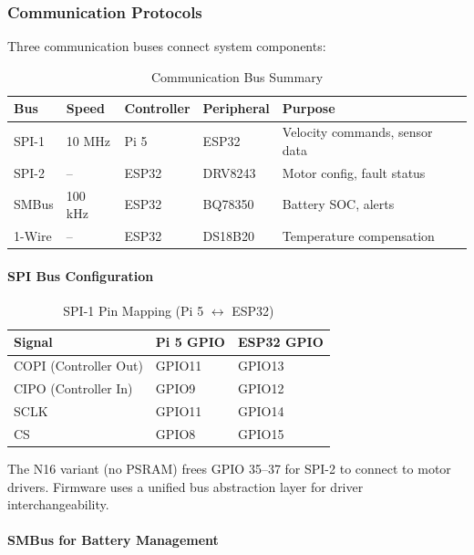 \subsubsection{Communication Protocols}

Three communication buses connect system components:

\begin{table}[H]
\centering
\caption{Communication Bus Summary}
\begin{tabular}{@{}llllp{4cm}@{}}
\toprule
\textbf{Bus} & \textbf{Speed} & \textbf{Controller} & \textbf{Peripheral} & \textbf{Purpose} \\
\midrule
SPI-1 & 10 MHz & Pi 5 & ESP32 & Velocity commands, sensor data \\
SPI-2 & -- & ESP32 & DRV8243 & Motor config, fault status \\
SMBus & 100 kHz & ESP32 & BQ78350 & Battery SOC, alerts \\
1-Wire & -- & ESP32 & DS18B20 & Temperature compensation \\
\bottomrule
\end{tabular}
\end{table}

\paragraph{SPI Bus Configuration}

\begin{table}[H]
\centering
\caption{SPI-1 Pin Mapping (Pi 5 $\leftrightarrow$ ESP32)}
\begin{tabular}{@{}lll@{}}
\toprule
\textbf{Signal} & \textbf{Pi 5 GPIO} & \textbf{ESP32 GPIO} \\
\midrule
COPI (Controller Out) & GPIO11 & GPIO13 \\
CIPO (Controller In) & GPIO9 & GPIO12 \\
SCLK & GPIO11 & GPIO14 \\
CS & GPIO8 & GPIO15 \\
\bottomrule
\end{tabular}
\end{table}

The N16 variant (no PSRAM) frees GPIO 35--37 for SPI-2 to connect to motor drivers. Firmware uses a unified bus abstraction layer for driver interchangeability.

\paragraph{SMBus for Battery Management}

